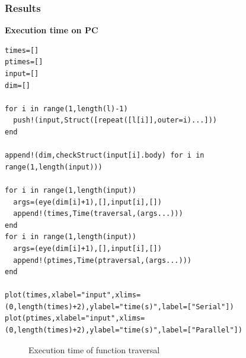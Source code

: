 \documentclass[a4paper,12pt]{article}
\begin{document}
\subsubsection{Results}
\textbf{Execution time on PC}
\begin{Verbatim}[fontsize=\footnotesize]
times=[]
ptimes=[]
input=[]
dim=[]

for i in range(1,length(l)-1)
  push!(input,Struct([repeat([l[i]],outer=i)...]))
end

append!(dim,checkStruct(input[i].body) for i in range(1,length(input)))

for i in range(1,length(input))
  args=(eye(dim[i]+1),[],input[i],[])
  append!(times,Time(traversal,(args...)))
end
for i in range(1,length(input))
  args=(eye(dim[i]+1),[],input[i],[])
  append!(ptimes,Time(ptraversal,(args...)))
end

plot(times,xlabel="input",xlims=(0,length(times)+2),ylabel="time(s)",label=["Serial"])
plot(ptimes,xlabel="input",xlims=(0,length(times)+2),ylabel="time(s)",label=["Parallel"])

\end{Verbatim}

\begin{figure}[!h]
\centering
{}
\caption{Execution time of function traversal}
\end{figure}
\end{document}
